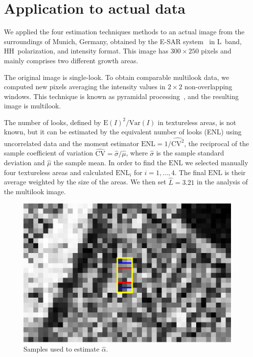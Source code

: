 \documentclass[twocolumn]{svjour3}
\begin{document}
	\section{Application to actual data}
	\label{application}
	
	We applied the four estimation techniques methods to an actual image from the surroundings of Munich, Germany, obtained by the E-SAR system~\cite{Horn1996} in L~band, HH~polarization, and intensity format. 
	This image has $300\times250$ pixels and mainly comprises two different growth areas.
	
	The original image is single-look.
	To obtain comparable multilook data, we computed new pixels averaging the intensity values in $2\times2$ non-overlapping windows. This technique is known as pyramidal processing~\cite{Adelson1984}, and the resulting image is multilook.
	
	The number of looks, defined by ${\text{E}(I)^2}/{\text{Var}(I)}$ in textureless areas, is not known, but it can be estimated by the equivalent number of looks (ENL) using uncorrelated data and the moment estimator
	$\text{ENL}={1}/{\widehat{\text{CV}^2}}$, the reciprocal of the sample coefficient of variation $\widehat{\text{CV}}={\widehat{\sigma}}/{\widehat\mu}$, where $\widehat{\sigma}$ is the sample standard deviation and $\widehat\mu$ the sample mean.
	In order to find the $\text{ENL}$ we selected manually four textureless areas and calculated $\text{ENL}_i$ for $i=1, \ldots, 4$. 
	The final $\text{ENL}$ is their average weighted by the size of the areas. 
	We then set $\widehat L=3.21$ in the analysis of the multilook image.
	
	\begin{figure}[hbt]
		\centering
		\includegraphics[width=0.8\linewidth]{../../../Figures/PaperTesis/TresMuestrasAgrandada.eps}
		\caption{Samples used to estimate $\widehat{\alpha}$.}\label{TresMuestras} 
	\end{figure}
	
\end{document}
